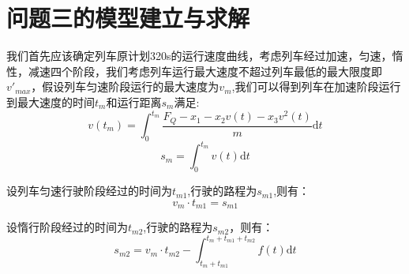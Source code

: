 \documentclass[12pt,a4paper]{nmmcm}
\begin{document}







\section{问题三的模型建立与求解}
我们首先应该确定列车原计划320s的运行速度曲线，考虑列车经过加速，匀速，惰性，减速四个阶段，我们考虑列车运行最大速度不超过列车最低的最大限度即$v'_{max}$，假设列车匀速阶段运行的最大速度为$v_m$,我们可以得到列车在加速阶段运行到最大速度的时间$t_m$和运行距离$s_m$满足:
\begin{equation}
v(t_m)=\int_0^{t_m}\frac{F_Q-x_1-x_2v(t)-x_3v^2(t)}{m}\mathrm{d}t
\end{equation}
\begin{equation}
s_m=\int_0^{t_m}v(t) \mathrm{d}t
\end{equation}

设列车匀速行驶阶段经过的时间为$t_{m1}$,行驶的路程为$s_{m1}$,则有：
\begin{equation}
v_m\cdot t_{m1}=s_{m1}
\end{equation}

设惰行阶段经过的时间为$t_{m2}$,行驶的路程为$s_{m2}$，则有：
\begin{equation}
s_{m2}=v_m\cdot t_{m2}-\int_{t_m+t_{m1}}^{t_m+t_{m1}+t_{m2}}f(t)\mathrm{d}t
\end{equation}
\end{document}
